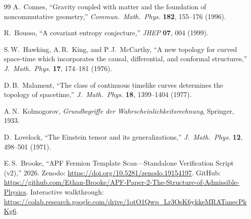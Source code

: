\documentclass[11pt,a4paper]{article}
\theoremstyle{definition}
\begin{document}
\begin{thebibliography}{99}
A.~Connes, ``Gravity coupled with matter and the foundation of
noncommutative geometry,''
\textit{Commun.\ Math.\ Phys.} \textbf{182}, 155--176 (1996).

R.~Bousso, ``A covariant entropy conjecture,''
\textit{JHEP} \textbf{07}, 004 (1999).

S.\,W.~Hawking, A.\,R.~King, and P.\,J.~McCarthy,
``A new topology for curved space-time which incorporates the causal,
differential, and conformal structures,''
\textit{J.\ Math.\ Phys.} \textbf{17}, 174--181 (1976).

D.\,B.~Malament, ``The class of continuous timelike curves determines
the topology of spacetime,''
\textit{J.\ Math.\ Phys.} \textbf{18}, 1399--1404 (1977).

A.\,N.~Kolmogorov, \textit{Grundbegriffe der Wahrscheinlichkeitsrechnung},
Springer, 1933.

D.~Lovelock, ``The Einstein tensor and its generalizations,''
\textit{J.\ Math.\ Phys.} \textbf{12}, 498--501 (1971).

E.\,S.~Brooke, ``APF Fermion Template Scan---Standalone Verification
Script (v2),'' 2026.
Zenodo: \url{https://doi.org/10.5281/zenodo.19154197}.
GitHub: \url{https://github.com/Ethan-Brooke/APF-Paper-2-The-Structure-of-Admissible-Physics}.
Interactive walkthrough:
\url{https://colab.research.google.com/drive/1otO1Qwp_Lr3OsK6ykkeMRATanecPkKg6}.

\end{thebibliography}
\end{document}
